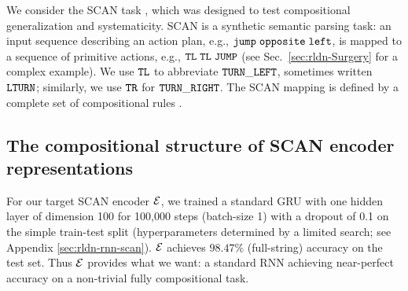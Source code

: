 We consider the SCAN task \citep{lake2018generalization}, which was designed to test compositional generalization and systematicity. SCAN is a synthetic semantic parsing
task: an input sequence describing an action plan, e.g., \textcolor{violet}{${\mathtt{jump \hspace{1mm} opposite \hspace{1mm} left}}$}, is mapped to a sequence of primitive actions, e.g., \textcolor{violet}{${\mathtt{TL \hspace{1mm} TL \hspace{1mm} JUMP}}$} (see Sec.~\ref{sec:rldn-Surgery} for a complex example). We use \textcolor{violet}{${\mathtt{TL}}$} to abbreviate \textcolor{violet}{${\mathtt{TURN\_LEFT}}$}, sometimes written \textcolor{violet}{${\mathtt{LTURN}}$}; similarly, we use \textcolor{violet}{${\mathtt{TR}}$} for \textcolor{violet}{${\mathtt{TURN\_RIGHT}}$}. The SCAN mapping is defined by a complete set of compositional rules \citep[Supplementary Fig. 7]{lake2018generalization}. 

\begin{table}[ht]
\caption{\label{tab:scan-accuracy}Mean substitution accuracy for learned (bold) and hand-defined role schemes on SCAN across three random initializations. Standard deviation was below 1\% for all schemes except for snapped. Substitution accuracy is measured by feeding \RLN's approximation to the target decoder. (Sec.~\ref{sec:rldn-SCANnetReps})}
\end{table}

\subsection{The compositional structure of SCAN encoder representations} \label{sec:rldn-SCANnetReps}

For our target SCAN encoder ${\mathcal{E}}$, we trained a standard GRU with one hidden layer of dimension 100 for 100,000 steps (batch-size 1) with a dropout of 0.1 on the simple train-test split (hyperparameters determined by a limited search; see Appendix \ref{sec:rldn-rnn-scan}).
${\mathcal{E}}$ achieves $98.47\%$ (full-string) accuracy on the test set. Thus ${\mathcal{E}}$ provides what we want: a standard RNN achieving near-perfect accuracy on a non-trivial fully compositional task.

